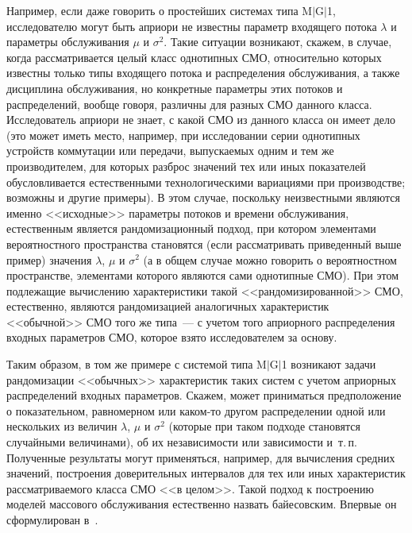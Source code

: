 \begin{multicols}{2}
Например, если даже говорить о простейших системах типа M$\vert$G$\vert$1, исследователю могут быть
априори не известны параметр входящего потока $\lambda$ и параметры обслуживания $\mu$ и $\sigma^2$. Такие ситуации
возникают, скажем, в случае, когда рассматривается целый класс однотипных СМО, относительно которых известны только
типы входящего потока и распределения обслуживания, а также дисциплина обслуживания, но конкретные параметры этих
потоков и распределений, вообще говоря, различны для разных СМО данного класса. Исследователь априори не знает, с
какой СМО из данного класса он имеет дело (это может иметь место, например, при исследовании серии однотипных устройств
коммутации или передачи, выпускаемых одним и тем же производителем, для которых разброс значений тех или иных
показателей обусловливается естественными технологическими вариациями при производстве; возможны и другие примеры). В
этом случае, поскольку неизвестными являются именно <<исходные>> параметры потоков и времени обслуживания, естественным
является рандомизационный подход, при котором элементами вероятностного пространства становятся (если рассматривать
приведенный выше пример) значения $\lambda$, $\mu$ и $\sigma^2$ (а в общем случае можно говорить о вероятностном
пространстве, элементами которого являются сами однотипные СМО). При этом подлежащие вычислению характеристики такой
<<рандомизированной>> СМО, естественно, являются рандомизацией аналогичных характеристик <<обычной>> СМО того же
типа~--- с учетом того априорного распределения входных параметров СМО, которое взято исследователем за основу.

Таким образом, в том же примере с системой типа M$\vert$G$\vert$1 возникают задачи рандомизации <<обычных>> характеристик таких систем с
учетом априорных распределений входных па\-ра\-мет\-ров. Скажем, может приниматься предположение о показательном, равномерном
или каком-то другом распределении одной или нескольких из величин $\lambda$, $\mu$ и $\sigma^2$ (которые при таком
подходе становятся случайными величинами), об их независимости или зависимости и~т.\,п. Полученные результаты могут
применяться, например, для вы\-чис\-ле\-ния средних значений, построения доверительных интервалов для тех или иных
характеристик рассматриваемого класса СМО <<в целом>>. Такой подход к построению моделей массового обслуживания
естественно назвать байесовским. Впервые он сформулирован в~\cite{Shorgin05}.


\end{multicols}
